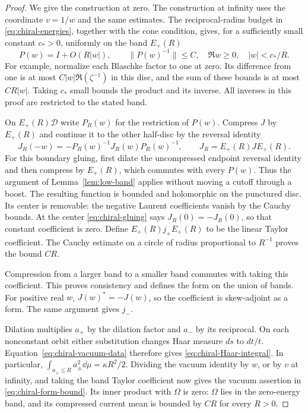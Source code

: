 \begin{proof}
We give the construction at zero. The construction at infinity uses the
coordinate $v=1/w$ and the same estimates. The reciprocal-radius budget
in \eqref{eq:chiral-energies}, together with the cone condition, gives,
for a sufficiently small constant $c_*>0$, uniformly on the band $E_+(R)$
\begin{equation}\label{eq:chiral-disc-inverse}
 P(w)=I+O(R|w|),\qquad \|P(w)^{-1}\|\le C,
                  \quad \Re w\ge0,\quad |w|<c_*/R.
\end{equation}
For example, normalize each Blaschke factor to one at zero. Its difference
from one is at most $C|w|\Re(\zeta^{-1})$ in this disc, and the sum of
these bounds is at most $CR|w|$. Taking $c_*$ small bounds the product and
its inverse. All inverses in this proof are restricted to the stated band.

On $E_+(R)\mathcal D$ write $P_R(w)$ for the restriction of $P(w)$.
Compress $J$ by $E_+(R)$ and continue it to the other half-disc by the
reversal identity
\begin{equation}\label{eq:chiral-gluing}
 J_R(-w)=-P_R(w)^{-1}J_R(w)P_R(w)^{-1},
       \qquad J_R=E_+(R)JE_+(R).
\end{equation}
For this boundary gluing, first dilate the uncompressed endpoint reversal
identity and then compress by $E_+(R)$, which commutes with every $P(w)$.
Thus the argument of Lemma~\ref{lem:low-band} applies without moving a
cutoff through a boost. The resulting
function is bounded and holomorphic on the punctured disc. Its center is
removable: the negative Laurent coefficients vanish by the Cauchy bounds.
At the center \eqref{eq:chiral-gluing} says $J_R(0)=-J_R(0)$, so that
constant coefficient is zero. Define $E_+(R)j_+E_+(R)$ to be the linear
Taylor coefficient. The Cauchy estimate on a circle of radius proportional
to $R^{-1}$ proves the bound $CR$.

Compression from a larger band to a smaller band commutes with taking
this coefficient. This proves consistency and defines the form on the
union of bands. For positive real $w$, $J(w)^*=-J(w)$, so the coefficient
is skew-adjoint as a form. The same argument gives $j_-$.

Dilation multiplies $a_+$ by the dilation factor and $a_-$ by its
reciprocal. On each nonconstant orbit either substitution changes Haar
measure $ds$ to $dt/t$. Equation~\eqref{eq:chiral-vacuum-data} therefore
gives \eqref{eq:chiral-Haar-integral}. In particular,
$\int_{a_\pm\le R}a_\pm^2\dd\mu=\kappa R^2/2$.
Dividing the vacuum identity by $w$, or by $v$ at infinity, and taking
the band Taylor coefficient now gives the vacuum assertion in
\eqref{eq:chiral-form-bound}. Its inner product with $\Omega$ is zero:
$\Omega$ lies in the zero-energy band, and its compressed current mean
is bounded by $CR$ for every $R>0$.


\end{proof}
